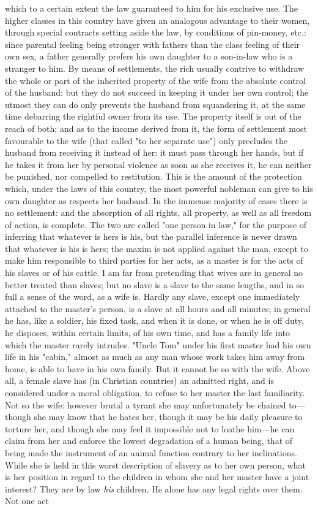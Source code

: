 \documentclass[12pt]{report}
\begin{document}
which to a certain extent the law guaranteed to him for his exclusive use. The higher classes in this country have given an analogous advantage to their women, through special contracts setting aside the law, by conditions of pin-money, etc.: since parental feeling being stronger with fathers than the class feeling of their own sex, a father generally prefers his own daughter to a son-in-law who is a stranger to him. By means of settlements, the rich usually contrive to withdraw the whole or part of the inherited property of the wife from the absolute control of the husband: but they do not succeed in keeping it under her own control; the utmost they can do only prevents the husband from squandering it, at the same time debarring the rightful owner from its use. The property itself is out of the reach of both; and as to the income derived from it, the form of settlement most favourable to the wife (that called "to her separate use") only precludes the husband from receiving it instead of her: it must pass through her hands, but if he takes it from her by personal violence as soon as she receives it, he can neither be punished, nor compelled to restitution. This is the amount of the protection which, under the laws of this country, the most powerful nobleman can give to his own daughter as respects her husband. In the immense majority of cases there is no settlement: and the absorption of all rights, all property, as well as all freedom of action, is complete. The two are called "one person in law," for the purpose of inferring that whatever is hers is his, but the parallel inference is never drawn that whatever is his is hers; the maxim is not applied against the man, except to make him responsible to third parties for her acts, as a master is for the acts of his slaves or of his cattle. I am far from pretending that wives are in general no better treated than slaves; but no slave is a slave to the same lengths, and in so full a sense of the word, as a wife is. Hardly any slave, except one immediately attached to the master's person, is a slave at all hours and all minutes; in general he has, like a soldier, his fixed task, and when it is done, or when he is off duty, he disposes, within certain limits, of his own time, and has a family life into which the master rarely intrudes. "Uncle Tom" under his first master had his own life in his "cabin," almost as much as any man whose work takes him away from home, is able to have in his own family. But it cannot be so with the wife. Above all, a female slave has (in Christian countries) an admitted right, and is considered under a moral obligation, to refuse to her master the last familiarity. Not so the wife: however brutal a tyrant she may unfortunately be chained to—though she may know that he hates her, though it may be his daily pleasure to torture her, and though she may feel it impossible not to loathe him—he can claim from her and enforce the lowest degradation of a human being, that of being made the instrument of an animal function contrary to her inclinations. While she is held in this worst description of slavery as to her own person, what is her position in regard to the children in whom she and her master have a joint interest? They are by law \emph{his} children. He alone has any legal rights over them. Not one act 
\end{document}
